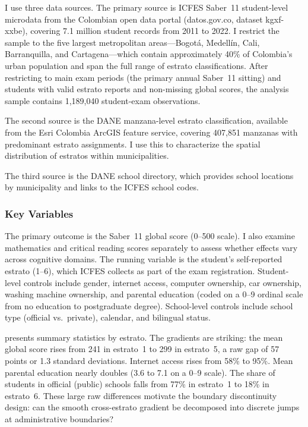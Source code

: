 \documentclass[12pt]{article}
\begin{document}
I use three data sources. The primary source is ICFES Saber~11 student-level microdata from the Colombian open data portal (datos.gov.co, dataset kgxf-xxbe), covering 7.1 million student records from 2011 to 2022. I restrict the sample to the five largest metropolitan areas---Bogot\'a, Medell\'in, Cali, Barranquilla, and Cartagena---which contain approximately 40\% of Colombia's urban population and span the full range of estrato classifications. After restricting to main exam periods (the primary annual Saber~11 sitting) and students with valid estrato reports and non-missing global scores, the analysis sample contains 1,189,040 student-exam observations.

The second source is the DANE manzana-level estrato classification, available from the Esri Colombia ArcGIS feature service, covering 407,851 manzanas with predominant estrato assignments. I use this to characterize the spatial distribution of estratos within municipalities.

The third source is the DANE school directory, which provides school locations by municipality and links to the ICFES school codes.

\subsubsection*{Key Variables} The primary outcome is the Saber~11 global score (0--500 scale). I also examine mathematics and critical reading scores separately to assess whether effects vary across cognitive domains. The running variable is the student's self-reported estrato (1--6), which ICFES collects as part of the exam registration. Student-level controls include gender, internet access, computer ownership, car ownership, washing machine ownership, and parental education (coded on a 0--9 ordinal scale from no education to postgraduate degree). School-level controls include school type (official vs.\ private), calendar, and bilingual status.



 presents summary statistics by estrato. The gradients are striking: the mean global score rises from 241 in estrato~1 to 299 in estrato~5, a raw gap of 57 points or 1.3 standard deviations. Internet access rises from 58\% to 95\%. Mean parental education nearly doubles (3.6 to 7.1 on a 0--9 scale). The share of students in official (public) schools falls from 77\% in estrato~1 to 18\% in estrato~6. These large raw differences motivate the boundary discontinuity design: can the smooth cross-estrato gradient be decomposed into discrete jumps at administrative boundaries?
\end{document}
